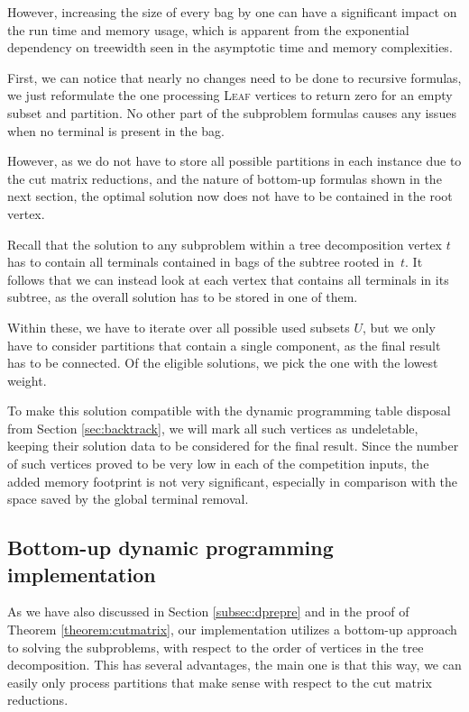 \documentclass[thesis=M,english,hidelinks]{FITthesis}[2012/10/20]
\theoremstyle{definition}
\begin{document}
However, increasing the size of every bag by one can have a significant impact on the run time and memory usage, which
is apparent from the exponential dependency on treewidth seen in the asymptotic time and memory complexities.

First, we can notice that nearly no changes need to be done to recursive formulas, we just reformulate the one
processing \textsc{Leaf} vertices to return zero for an empty subset and partition. No other part of the subproblem
formulas causes any issues when no terminal is present in the bag.

However, as we do not have to store all possible partitions in each instance due to the cut matrix reductions, and the
nature of bottom-up formulas shown in the next section, the optimal solution now does not have to be contained in the
root vertex.

Recall that the solution to any subproblem within a tree decomposition vertex $t$ has to contain all terminals contained
in bags of the subtree rooted in~$t$. It follows that we can instead look at each vertex that
contains all terminals in its subtree, as the overall solution has to be stored in one of them.

Within these, we have to iterate over all possible used subsets $U$, but we only have to consider partitions that
contain a single component, as the final result has to be connected. Of the eligible solutions, we pick the one with
the lowest weight.

To make this solution compatible with the dynamic programming table disposal from Section \ref{sec:backtrack}, we will
mark all such vertices as undeletable, keeping their solution data to be considered for the final result. Since the
number of such vertices proved to be very low in each of the competition inputs, the added memory footprint is not very
significant, especially in comparison with the space saved by the global terminal removal.

\subsection{Bottom-up dynamic programming implementation}
\label{sec:bottomup}

As we have also discussed in Section \ref{subsec:dprepre} and in the proof of Theorem \ref{theorem:cutmatrix}, our
implementation utilizes a bottom-up approach to solving the subproblems, with respect to the order of vertices in the
tree decomposition. This has several advantages, the main one is that this way, we can easily only process partitions
that make sense with respect to the cut matrix reductions.
\end{document}
